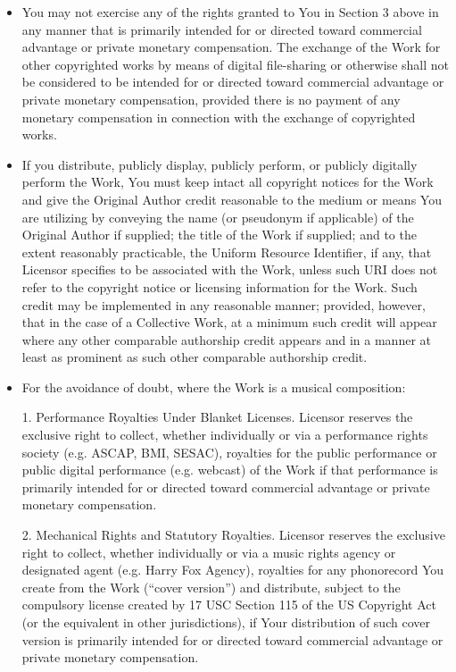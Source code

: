 \begin{itemize}
\begin{itemize}
\item You may not exercise any of the rights granted to You in Section
3 above in any manner that is primarily intended for or directed
toward commercial advantage or private monetary compensation.  The
exchange of the Work for other copyrighted works by means of digital
file-sharing or otherwise shall not be considered to be intended for
or directed toward commercial advantage or private monetary
compensation, provided there is no payment of any monetary
compensation in connection with the exchange of copyrighted works.

\item If you distribute, publicly display, publicly perform, or
publicly digitally perform the Work, You must keep intact all
copyright notices for the Work and give the Original Author credit
reasonable to the medium or means You are utilizing by conveying the
name (or pseudonym if applicable) of the Original Author if supplied;
the title of the Work if supplied; and to the extent reasonably
practicable, the Uniform Resource Identifier, if any, that Licensor
specifies to be associated with the Work, unless such URI does not
refer to the copyright notice or licensing information for the Work. 
Such credit may be implemented in any reasonable manner; provided,
however, that in the case of a Collective Work, at a minimum such
credit will appear where any other comparable authorship credit
appears and in a manner at least as prominent as such other comparable
authorship credit.

\item

For the avoidance of doubt, where the Work is a musical composition:

1.  Performance Royalties Under Blanket Licenses.  Licensor reserves
the exclusive right to collect, whether individually or via a
performance rights society (e.g.  ASCAP, BMI, SESAC), royalties for
the public performance or public digital performance (e.g.  webcast)
of the Work if that performance is primarily intended for or directed
toward commercial advantage or private monetary compensation.

2.  Mechanical Rights and Statutory Royalties.  Licensor reserves the
exclusive right to collect, whether individually or via a music rights
agency or designated agent (e.g.  Harry Fox Agency), royalties for any
phonorecord You create from the Work (``cover version'') and
distribute, subject to the compulsory license created by 17 USC
Section 115 of the US Copyright Act (or the equivalent in other
jurisdictions), if Your distribution of such cover version is
primarily intended for or directed toward commercial advantage or
private monetary compensation.


\end{itemize}
\end{itemize}
